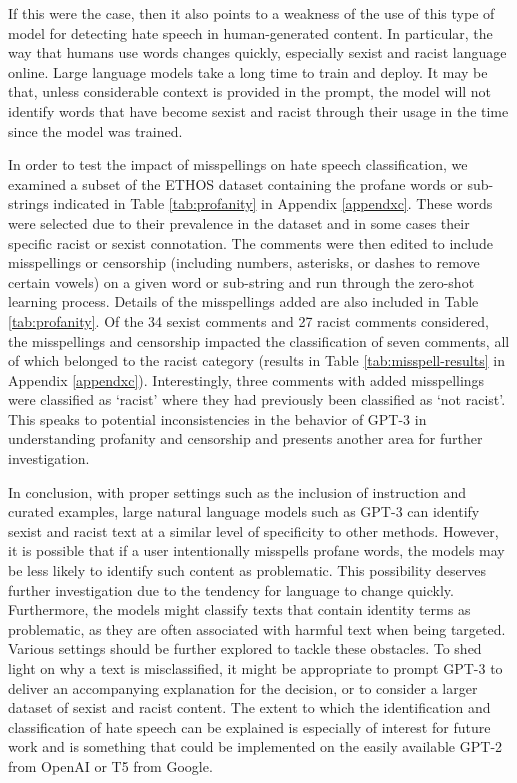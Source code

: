 \documentclass{bmcart}
\begin{document}
If this were the case, then it also points to a weakness of the use of this type of model for detecting hate speech in human-generated content. In particular, the way that humans use words changes quickly, especially sexist and racist language online. Large language models take a long time to train and deploy. It may be that, unless considerable context is provided in the prompt, the model will not identify words that have become sexist and racist through their usage in the time since the model was trained.

In order to test the impact of misspellings on hate speech classification, we examined a subset of the ETHOS dataset containing the profane words or sub-strings indicated in Table \ref{tab:profanity} in Appendix \ref{appendxc}. These words were selected due to their prevalence in the dataset and in some cases their specific racist or sexist connotation. The comments were then edited to include misspellings or censorship (including numbers, asterisks, or dashes to remove certain vowels) on a given word or sub-string and run through the zero-shot learning process. Details of the misspellings added are also included in Table \ref{tab:profanity}. Of the 34 sexist comments and 27 racist comments considered, the misspellings and censorship impacted the classification of seven comments, all of which belonged to the racist category (results in Table \ref{tab:misspell-results} in Appendix \ref{appendxc}). Interestingly, three comments with added misspellings were classified as `racist' where they had previously been classified as `not racist'. This speaks to potential inconsistencies in the behavior of GPT-3 in understanding profanity and censorship and presents another area for further investigation.

In conclusion, with proper settings such as the inclusion of instruction and curated examples, large natural language models such as GPT-3 can identify sexist and racist text at a similar level of specificity to other methods. However, it is possible that if a user intentionally misspells profane words, the models may be less likely to identify such content as problematic. This possibility deserves further investigation due to the tendency for language to change quickly. Furthermore, the models might classify texts that contain identity terms as problematic, as they are often associated with harmful text when being targeted. Various settings should be further explored to tackle these obstacles. To shed light on why a text is misclassified, it might be appropriate to prompt GPT-3 to deliver an accompanying explanation for the decision, or to consider a larger dataset of sexist and racist content. The extent to which the identification and classification of hate speech can be explained is especially of interest for future work and is something that could be implemented on the easily available GPT-2 from OpenAI or T5 from Google.
\end{document}
